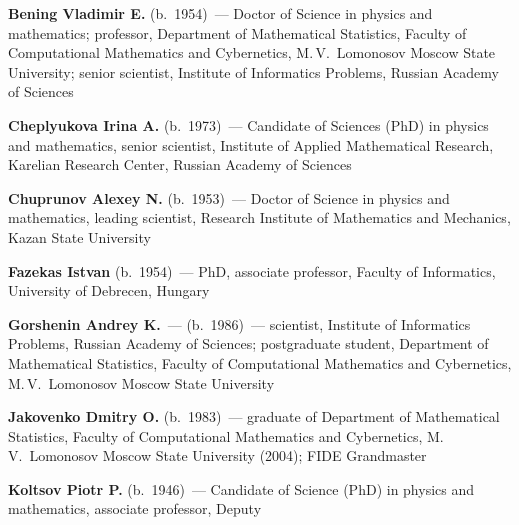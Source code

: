 \begin{multicols}{2}


\noindent
\textbf{Bening Vladimir E.} (b.\ 1954)~--- Doctor of Science in physics and 
mathematics; professor, Department of Mathematical Statistics, Faculty of Computational 
Mathematics and Cybernetics, M.\,V.~Lomonosov Moscow State University; senior scientist, 
Institute of  Informatics Problems, Russian Academy of Sciences
{

}

\vspace*{7pt}

\noindent
\textbf{Cheplyukova Irina A.} (b.\ 1973)~--- Candidate of Sciences (PhD) 
in physics and mathematics, senior scientist, Institute of Applied 
Mathematical Research, Karelian Research Center, Russian Academy of Sciences

\vspace*{7pt}

\noindent
\textbf{Chuprunov Alexey N.} (b.\ 1953)~--- Doctor of Science in physics and mathematics,
leading scientist, Research Institute of Mathematics and Mechanics, Kazan State University

\vspace*{7pt}

\noindent
\textbf{Fazekas Istvan} (b.\ 1954)~--- PhD, associate professor, Faculty of Informatics, University of Debrecen, Hungary

\vspace*{7pt}

\noindent
\textbf{Gorshenin Andrey K.}~--- (b.\ 1986)~--- scientist, Institute of Informatics Problems, Russian Academy of Sciences; postgraduate student, 
Department of Mathematical Statistics, 
Faculty of Computational Mathematics and Cybernetics, M.\,V.~Lomonosov Moscow State University

\vspace*{7pt}

\noindent
\textbf{Jakovenko Dmitry O.} (b.\ 1983)~---  graduate of Department of Mathematical Statistics, 
Faculty of Computational Mathematics and Cybernetics, 
M.\,V.~Lomonosov Moscow State University (2004); FIDE Grandmaster

\vspace*{7pt}

\noindent
\textbf{Koltsov Piotr P.} (b.\ 1946)~--- Candidate of Science (PhD) in physics and 
mathematics, associate professor, Deputy\linebreak\vspace*{-12pt}
\columnbreak


\end{multicols}
